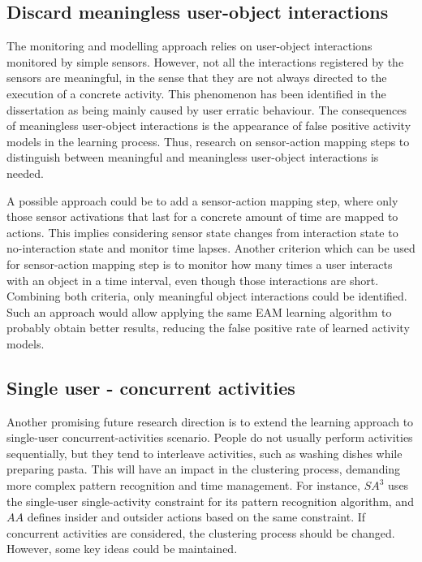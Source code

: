 \subsection{Discard meaningless user-object interactions}

The monitoring and modelling approach relies on user-object interactions monitored by simple sensors. However, not all the interactions registered by the sensors are meaningful, in the sense that they are not always directed to the execution of a concrete activity. This phenomenon has been identified in the dissertation as being mainly caused by user erratic behaviour. The consequences of meaningless user-object interactions is the appearance of false positive activity models in the learning process. Thus, research on sensor-action mapping steps to distinguish between meaningful and meaningless user-object interactions is needed.

A possible approach could be to add a sensor-action mapping step, where only those sensor activations that last for a concrete amount of time are mapped to actions. This implies considering sensor state changes from interaction state to no-interaction state and monitor time lapses. Another criterion which can be used for sensor-action mapping step is to monitor how many times a user interacts with an object in a time interval, even though those interactions are short. Combining both criteria, only meaningful object interactions could be identified. Such an approach would allow applying the same EAM learning algorithm to probably obtain better results, reducing the false positive rate of learned activity models.

\subsection{Single user - concurrent activities}

Another promising future research direction is to extend the learning approach to single-user concurrent-activities scenario. People do not usually perform activities sequentially, but they tend to interleave activities, such as washing dishes while preparing pasta. This will have an impact in the clustering process, demanding more complex pattern recognition and time management. For instance, $SA^3$ uses the single-user single-activity constraint for its pattern recognition algorithm, and $AA$ defines insider and outsider actions based on the same constraint. If concurrent activities are considered, the clustering process should be changed. However, some key ideas could be maintained. 

